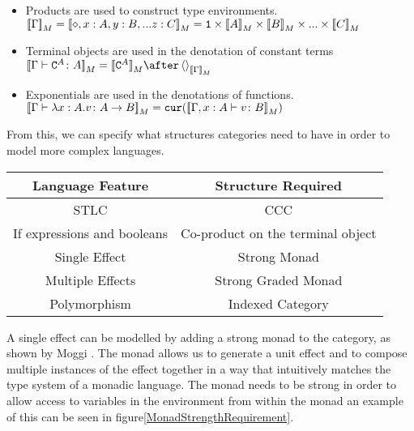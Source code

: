 \documentclass{Report}
\begin{document}

\begin{itemize}
    \item Products are used to construct type environments. $\deno{\G} = \deno{\nil, x: A, y:B, ... z:C} = \1 \times \deno{A} \times \deno{B} \times ... \times \deno{C}$
    \item Terminal objects are used in the denotation of constant terms $\deno{\gtyperelation{\const{A}}{A}} = \deno{\const{A}}\after\term{\deno{\G}}$
    \item Exponentials are used in the denotations of functions. ${\bf [\![}\Gamma \vdash \lambda x : A. v \colon A\rightarrow B{\bf ]\!]}_M = \texttt{cur}({\bf [\![}\Gamma, x: A \vdash v \colon B{\bf ]\!]}_M)$
\end{itemize}

From this, we can specify what structures categories need to have in order to model more complex languages.
\begin{center}
    \begin{tabular}{|c|c|}
        \hline
        Language Feature & Structure Required \\
        \hline
        \hline
        STLC            & CCC \\
        \hline
        If expressions and booleans   & Co-product on the terminal object \\
        \hline
        Single Effect   & Strong Monad \\
        \hline
        Multiple Effects & Strong Graded Monad \\
        \hline
        Polymorphism & Indexed Category \\
        \hline
    \end{tabular}
\end{center}


A single effect can be modelled by adding a strong monad to the category, as shown by Moggi . The monad allows us to generate a unit effect and to compose multiple instances of the effect together in a way that intuitively matches the type system of a monadic language. The monad needs to be strong in order to allow access to variables in the environment from within the monad an example of this can be seen in figure\ref{MonadStrengthRequirement}. 
\end{document}
